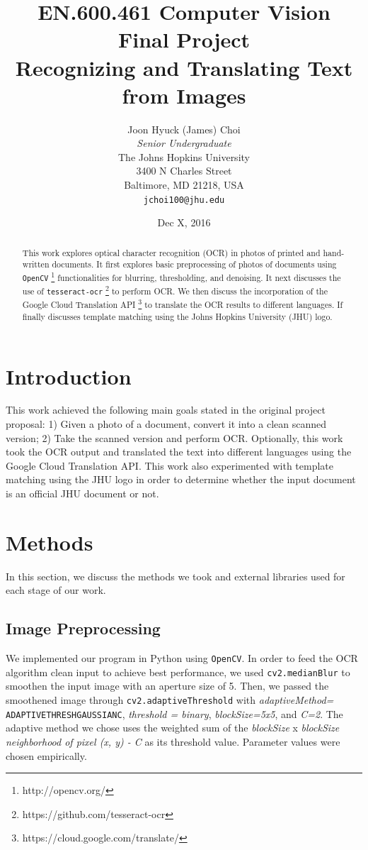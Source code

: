 \documentclass[11pt,letterpaper]{article}
\title{EN.600.461 Computer Vision\\Final Project\\Recognizing and Translating Text from Images}
\author{Joon Hyuck (James) Choi\\
  \textit{Senior Undergraduate}\\
  The Johns Hopkins University\\
  3400 N Charles Street\\
  Baltimore, MD 21218, USA\\
  {\tt jchoi100@jhu.edu}}
\date{Dec X, 2016}
\begin{document}
\maketitle
\begin{abstract}
  This work explores optical character recognition (OCR) in photos of printed and hand-written documents. It first explores basic preprocessing of photos of documents using {\tt OpenCV} \footnote{http://opencv.org/} functionalities for blurring, thresholding, and denoising. It next discusses the use of {\tt tesseract-ocr} \footnote{https://github.com/tesseract-ocr} to perform OCR. We then discuss the incorporation of the Google Cloud Translation API \footnote{https://cloud.google.com/translate/} to translate the OCR results to different languages. If finally discusses template matching using the Johns Hopkins University (JHU) logo. 
\end{abstract}

\section{Introduction}

This work achieved the following main goals stated in the original project proposal: 1) Given a photo of a document, convert it into a clean scanned version; 2) Take the scanned version and perform OCR. Optionally, this work took the OCR output and translated the text into different languages using the Google Cloud Translation API. This work also experimented with template matching using the JHU logo in order to determine whether the input document is an official JHU document or not.

\section{Methods}

In this section, we discuss the methods we took and external libraries used for each stage of our work.

\subsection{Image Preprocessing}

We implemented our program in Python using {\tt OpenCV}. In order to feed the OCR algorithm clean input to achieve best performance, we used {\tt cv2.medianBlur} to smoothen the input image with an aperture size of 5. Then, we passed the smoothened image through {\tt cv2.adaptiveThreshold} with \textit{adaptiveMethod=} {\tt ADAPTIVE\textunderscore THRESH\textunderscore GAUSSIAN\textunderscore C}, \textit{threshold = binary}, \textit{blockSize=5x5}, and \textit{C=2}. The adaptive method we chose uses the weighted sum of the \textit{blockSize} x \textit{blockSize neighborhood of pixel (x, y) - C} as its threshold value. Parameter values were chosen empirically.
\end{document}
